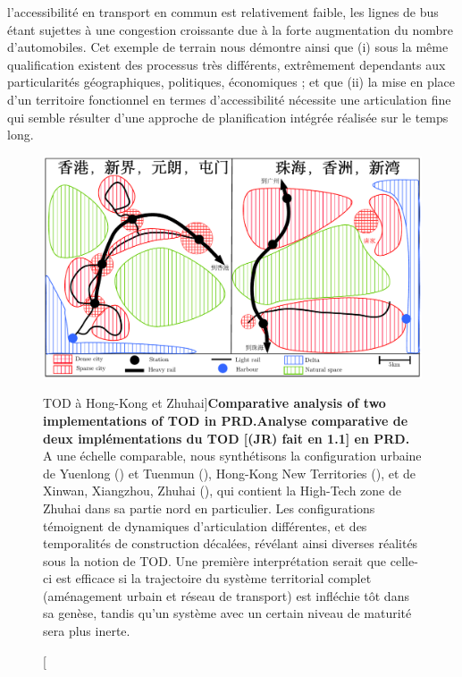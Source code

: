 {l'accessibilité en transport en commun est relativement faible, les lignes de bus étant sujettes à une congestion croissante due à la forte augmentation du nombre d'automobiles. Cet exemple de terrain nous démontre ainsi que (i) sous la même qualification existent des processus très différents, extrêmement dependants aux particularités géographiques, politiques, économiques ; et que (ii) la mise en place d'un territoire fonctionnel en termes d'accessibilité nécessite une articulation fine qui semble résulter d'une approche de planification intégrée réalisée sur le temps long.
}



\begin{figure}
	\includegraphics[width=\linewidth]{Figures/Qualitative/tod}
	\caption[TOD in Hong-Kong and Zhuhai][TOD à Hong-Kong et Zhuhai]{\textbf{Comparative analysis of two implementations of TOD in PRD.}\label{fig:qualitative:schema}}{\textbf{Analyse comparative de deux implémentations du TOD [(JR) fait en 1.1] en PRD.} A une échelle comparable, nous synthétisons la configuration urbaine de Yuenlong () et Tuenmun (), Hong-Kong New Territories (), et de Xinwan, Xiangzhou, Zhuhai (), qui contient la High-Tech zone de Zhuhai dans sa partie nord en particulier. Les configurations témoignent de dynamiques d'articulation différentes, et des temporalités de construction décalées, révélant ainsi diverses réalités sous la notion de TOD. Une première interprétation serait que celle-ci est efficace si la trajectoire du système territorial complet (aménagement urbain et réseau de transport) est infléchie tôt dans sa genèse, tandis qu'un système avec un certain niveau de maturité sera plus inerte.\label{fig:qualitative:schema}}
\end{figure}




